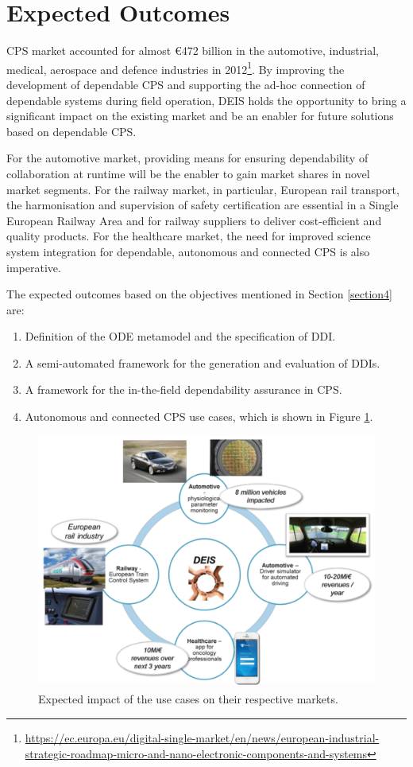 \section{Expected Outcomes}

CPS market accounted for almost \euro 472 billion in the automotive, industrial, medical, aerospace and defence industries in 2012\footnote{\url{https://ec.europa.eu/digital-single-market/en/news/european-industrial-strategic-roadmap-micro-and-nano-electronic-components-and-systems}}. By improving the development of dependable CPS and supporting the ad-hoc connection of dependable systems during field operation, DEIS holds the opportunity to bring a significant impact on the existing market and be an enabler for future solutions based on dependable CPS. 

For the automotive market, providing means for ensuring dependability of collaboration at runtime will be the enabler to gain market shares in novel market segments. For the railway market, in particular, European rail transport, the harmonisation and supervision of safety certification are essential in a Single European Railway Area and for railway suppliers to deliver cost-efficient and quality products. For the healthcare market, the need for improved science system integration for dependable, autonomous and connected CPS is also imperative.

The expected outcomes based on the objectives mentioned in Section \ref{section4} are:

\begin{enumerate}
	\item Definition of the ODE metamodel and the specification of DDI. 
	\item A semi-automated framework for the generation and evaluation of DDIs.
	\item A framework for the in-the-field dependability assurance in CPS.
	\item Autonomous and connected CPS use cases, which is shown in Figure \ref{fig:impacts}.
\end{enumerate}

\begin{figure}[ht!]
	\centering
	\includegraphics[width=1\linewidth]{./fig/usecase_impacts.pdf}
	\caption{Expected impact of the use cases on their respective markets.}
	\label{fig:impacts}
\end{figure}
